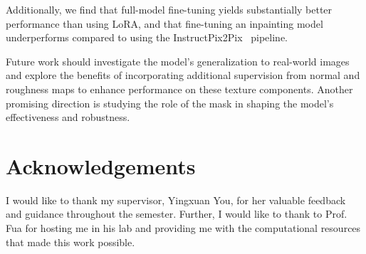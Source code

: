 \documentclass[11pt,twocolumn]{article}
\begin{document}
Additionally, we find that full-model fine-tuning yields substantially better performance than using LoRA, 
and that fine-tuning an inpainting model underperforms compared to using the 
InstructPix2Pix~\cite{instructpix2pix} pipeline.

Future work should investigate the model's generalization to real-world images and explore the benefits 
of incorporating additional supervision from normal and roughness maps to enhance performance on these 
texture components. Another promising direction is studying the role of the mask in shaping the model's 
effectiveness and robustness.

\section{Acknowledgements}
I would like to thank my supervisor, Yingxuan You, for her valuable feedback and guidance throughout the semester. 
Further, I would like to thank to Prof. Fua for hosting me in his lab and providing me with the computational resources
that made this work possible.


\newpage


\end{document}
